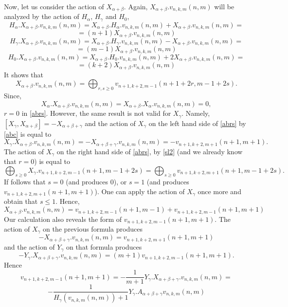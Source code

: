 \documentclass[twoside,a4paper,12pt]{article}
\theoremstyle{definition}
\begin{document}
Now, let us consider the action of $X_{\alpha+\beta}$. Again,
$X_{\alpha+\beta}.v_{n,k,m}(n,m)$ will be analyzed by the action of
$H_\alpha$, $H_\gamma$ and $H_0$,
\[ H_\alpha.X_{\alpha+\beta}.v_{n,k,m}(n,m)=
	X_{\alpha+\beta}.H_\alpha.v_{n,k,m}(n,m)+X_{\alpha+\beta}.
	v_{n,k,m}(n,m)= \]
\[ =(n+1)X_{\alpha+\beta}.v_{n,k,m}(n,m) \]
\[ H_\gamma.X_{\alpha+\beta}.v_{n,k,m}(n,m)=
	X_{\alpha+\beta}.H_\gamma.v_{n,k,m}(n,m)-X_{\alpha+\beta}.
	v_{n,k,m}(n,m)= \]
\[ =(m-1)X_{\alpha+\beta}.v_{n,k,m}(n,m) \]
\[ H_0.X_{\alpha+\beta}.v_{n,k,m}(n,m)=
	X_{\alpha+\beta}.H_0.v_{n,k,m}(n,m)+2X_{\alpha+\beta}.
	v_{n,k,m}(n,m)= \]
\[ =(k+2)X_{\alpha+\beta}.v_{n,k,m}(n,m) \]
It shows that
\begin{equation}\label{abrs}
	X_{\alpha+\beta}.v_{n,k,m}(n,m)=
	\bigoplus_{r,s\geq 0}v_{n+1,k+2,m-1}(n+1+2r,m-1+2s).
\end{equation}
Since,
\[ X_\alpha.X_{\alpha+\beta}.v_{n,k,m}(n,m)=
	X_{\alpha+\beta}.X_\alpha.v_{n,k,m}(n,m)=0, \]
$r=0$ in \eqref{abrs}. However, the same result is not valid for $X_\gamma$.
Namely, $[X_\gamma,X_{\alpha+\beta}]=-X_{\alpha+\beta+\gamma}$ and the action of
$X_{\gamma}$ on the left hand side of \eqref{abrs} by \eqref{abc} is equal to
\[ X_\gamma.X_{\alpha+\beta}.v_{n,k,m}(n,m)=
	-X_{\alpha+\beta+\gamma}.v_{n,k,m}(n,m)=
	-v_{n+1,k+2,m+1}(n+1,m+1). \]
The action of $X_{\gamma}$ on the right hand side of \eqref{abrs}, by
\eqref{sl2} (and we already know that $r=0$) is equal to
\begin{equation*}%
	\bigoplus_{s\geq 0}X_{\gamma}.v_{n+1,k+2,m-1}(n+1,m-1+2s)=
	\bigoplus_{s\geq 0}v_{n+1,k+2,m+1}(n+1,m-1+2s).
\end{equation*}
If follows that $s=0$ (and produces 0), or $s=1$ (and produces
$v_{n+1,k+2,m+1}(n+1,m+1)$). One can apply the action of $X_\gamma$ once more
and obtain that $s\leq1$. Hence,
\begin{equation}\label{abt}
	X_{\alpha+\beta}.v_{n,k,m}(n,m)=
	v_{n+1,k+2,m-1}(n+1,m-1)+v_{n+1,k+2,m-1}(n+1,m+1)
\end{equation}
Our calculation also reveals the form of $v_{n+1,k+2,m-1}(n+1,m+1)$. The action
of $X_\gamma$ on the previous formula produces
\[ -X_{\alpha+\beta+\gamma}.v_{n,k,m}(n,m)=v_{n+1,k+2,m+1}(n+1,m+1) \]
and the action of $Y_\gamma$ on that formula produces
\[ -Y_\gamma.X_{\alpha+\beta+\gamma}.v_{n,k,m}(n,m)=
	(m+1)v_{n+1,k+2,m-1}(n+1,m+1). \]
Hence
\[ v_{n+1,k+2,m-1}(n+1,m+1)=
	-\frac1{m+1}Y_\gamma.X_{\alpha+\beta+\gamma}.v_{n,k,m}(n,m)= \]
\[ -\frac1{H_\gamma(v_{n,k,m}(n,m))+1}Y_\gamma.A_{\alpha+\beta+\gamma}
	v_{n,k,m}(n,m) \]
\end{document}
